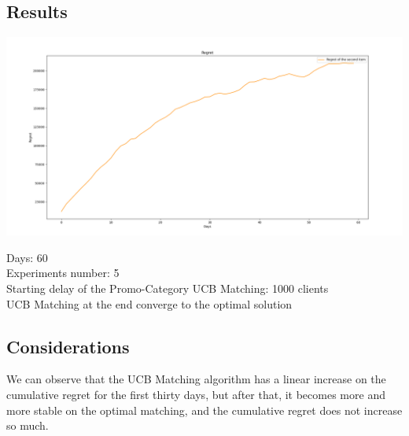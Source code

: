\subsection*{Results}
\begin{center}
	\includegraphics[scale=0.30]{Images/n5}
\end{center}
Days: 60\\
Experiments number: 5 \\
Starting delay of the Promo-Category UCB Matching: 1000 clients\\
UCB Matching at the end converge to the optimal solution \\
\subsection*{Considerations}
We can observe that the UCB Matching algorithm has a linear increase on the cumulative regret for the first thirty days, but after that, it becomes more and more stable on the optimal matching, and the cumulative regret does not increase so much.